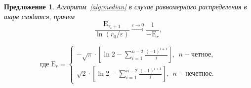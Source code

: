 \documentclass[specialist,
substylefile = spbu.rtx,
               subf,href,colorlinks=true, 12pt]{disser}
\newtheorem{proposition}{Предложение}
\begin{document}
\begin{proposition}
Алгоритм~\ref{alg:median} в случае равномерного распределения в шаре сходится, причем \[
\frac{\mathrm{E}_{\tau_{\varepsilon} +1}}{\ln (r_0/\varepsilon)}\xrightarrow{\varepsilon \to 0 } \frac{1}{-\mathrm{E}_{r}},
\]
\vspace{-7ex}

\[
\text{где}\; \displaystyle
\mathrm{E}_{r}= \left\{\begin{array}{l}  -\sqrt{\pi}\cdot  \left[\ln 2 - \displaystyle \sum\limits_{i=1}^{n-2}\frac{(-1)^{i+1}}{i}\right],\; \, n-\text{четное},\\[3ex] 
\sqrt{2}\cdot \left[\ln 2 - \displaystyle \sum\limits_{i=1}^{n-2}\frac{(-1)^{i+1}}{i}\right],\; \, n-\text{нечетное}.
\end{array}\right.
\]
\label{prop: med}
\end{proposition}
\end{document}

